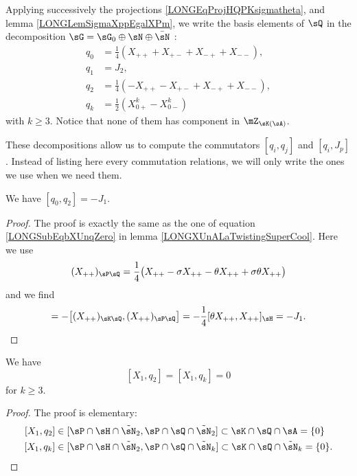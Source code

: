 Applying successively the projections \eqref{LONGEqProjHQPKsigmatheta}, and lemma \ref{LONGLemSigmaXppEgalXPm}, we write the basis elements of $\sQ$ in the decomposition $\sG=\sG_0\oplus\sN\oplus\bar\sN$ :
\begin{subequations}			\label{LONGEqsDecopmQXpmpm}
	\begin{align}
		q_0&=\frac{1}{ 4 }(X_{++}+X_{+-}+X_{-+}+X_{--}),		\\
		q_1&=J_2,							\\
		q_2&=\frac{1}{ 4 }(-X_{++}-X_{+-}+X_{-+}+X_{--}),		\\
		q_k&=\frac{ 1 }{2}(X^{k}_{0+}-X^{k}_{0-})
	\end{align}
\end{subequations}
with $k\geq 3$. Notice that none of them has component in $\mZ_{\sK(\sA)}$.

These decompositions allow us to compute the commutators $[q_i,q_j]$ and $[q_i,J_p]$. Instead of listing here every commutation relations, we will only write the ones we use when we need them.


\begin{lemma}		\label{LONGLemQzQdeuxJun}
	We have $[q_0,q_2]=-J_1$.
\end{lemma}

\begin{proof}
	The proof is exactly the same as the one of equation \eqref{LONGSubEqbXUnqZero} in lemma \ref{LONGXUnALaTwistingSuperCool}. Here we use
	\begin{equation}
		(X_{++})_{\sP\sQ}=\frac{1}{ 4 }\big( X_{++}-\sigma X_{++}-\theta X_{++}+\sigma\theta X_{++} \big)
	\end{equation}
	and we find
	\begin{equation}
		[q_0,q_2]=-\big[ (X_{++})_{\sK \sQ},(X_{++})_{\sP\sQ} \big]=-\frac{1}{ 4 }[\theta X_{++},X_{++}]_{\sH}=-J_1.
	\end{equation}
\end{proof}

\begin{lemma}
We have
	\begin{equation}		\label{LONGEqXunQdeuxcommutent}
		[X_1,q_2]=[X_1,q_k]=0
	\end{equation}
	for $k\geq 3$.
\end{lemma}
\begin{proof}
	The proof is elementary:
	\begin{equation}
		\begin{aligned}[]
			[X_1,q_2]&\in[\sP\cap\sH\cap\tilde\sN_2,\sP\cap\sQ\cap\tilde\sN_2]\subset\sK\cap\sQ\cap\sA=\{ 0 \}\\
			[X_1,q_k]&\in[\sP\cap\sH\cap\tilde\sN_2,\sP\cap\sQ\cap\tilde\sN_k]\subset\sK\cap\sQ\cap\tilde\sN_k=\{ 0 \}.
		\end{aligned}
	\end{equation}
\end{proof}

